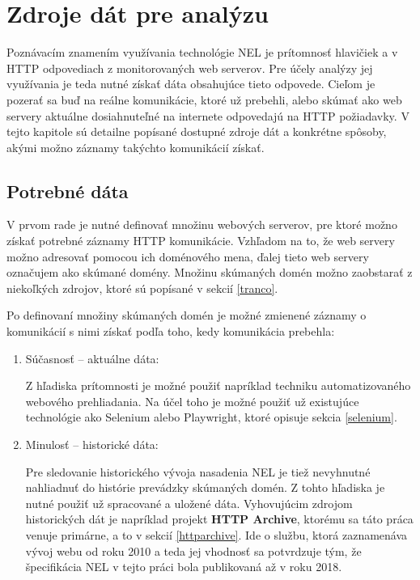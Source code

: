 \chapter{Zdroje dát pre analýzu}
\label{data-sources-available-for-research}


Poznávacím znamením využívania technológie NEL je prítomnosť hlavičiek  a  v HTTP odpovediach z monitorovaných web serverov. 
Pre účely analýzy jej využívania je teda nutné získať dáta obsahujúce tieto odpovede.
Cieľom je pozerať sa buď na reálne komunikácie, ktoré už prebehli, alebo skúmať ako web servery aktuálne dosiahnuteľné na internete
odpovedajú na HTTP požiadavky. 
V tejto kapitole sú detailne popísané dostupné zdroje dát a konkrétne spôsoby, akými možno záznamy takýchto komunikácií získať.

\section{Potrebné dáta}

V prvom rade je nutné definovať množinu webových serverov, pre ktoré možno získať potrebné záznamy HTTP komunikácie.
Vzhľadom na to, že web servery možno adresovať pomocou ich doménového mena, ďalej tieto web servery označujem ako skúmané domény.
Množinu skúmaných domén možno zaobstarať z niekoľkých zdrojov, ktoré sú popísané v sekcií \ref{tranco}.

Po definovaní množiny skúmaných domén je možné zmienené záznamy o komunikácií s nimi získať podľa toho, kedy komunikácia prebehla:
\begin{enumerate}
    \item Súčasnosť -- aktuálne dáta:
    
    Z hľadiska prítomnosti je možné použiť napríklad techniku automatizovaného webového prehliadania.
    Na účel toho je možné použiť už existujúce technológie ako Selenium alebo Playwright, ktoré opisuje sekcia \ref{selenium}.

    \item Minulosť -- historické dáta:

    Pre sledovanie historického vývoja nasadenia NEL je tiež nevyhnutné nahliadnuť do histórie prevádzky skúmaných domén. 
    Z tohto hľadiska je nutné použiť už spracované a uložené dáta. 
    Vyhovujúcim zdrojom historických dát je napríklad projekt \textbf{HTTP Archive}, ktorému sa táto práca venuje primárne, a to v sekcií \ref{httparchive}.
    Ide o službu, ktorá zaznamenáva vývoj webu od roku 2010 a teda jej vhodnosť sa potvrdzuje tým, že špecifikácia NEL v tejto práci bola publikovaná až v roku 2018.
\end{enumerate}

